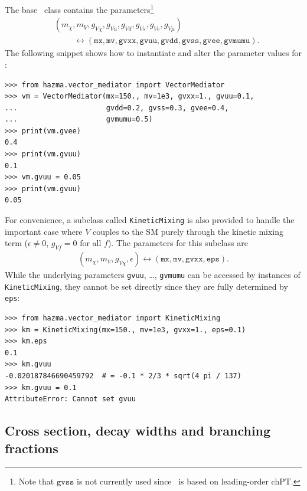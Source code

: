 The base \vm\ class contains the parameters\footnote{Note that $\texttt{gvss}$ is not currently used since \vm\ is based on leading-order chPT.}
\begin{align*}
    &(m_\chi, m_V, g_{V\chi}, g_{Vu}, g_{Vd}, g_{Vs}, g_{Ve}, g_{V\mu})\\
    &\hspace{1cm} \leftrightarrow (\texttt{mx}, \texttt{mv}, \texttt{gvxx}, \texttt{gvuu}, \texttt{gvdd}, \texttt{gvss}, \texttt{gvee}, \texttt{gvmumu}).
\end{align*}
The following snippet shows how to instantiate and alter the parameter values for \vm:
\begin{verbatim}
>>> from hazma.vector_mediator import VectorMediator
>>> vm = VectorMediator(mx=150., mv=1e3, gvxx=1., gvuu=0.1,
...                     gvdd=0.2, gvss=0.3, gvee=0.4,
...                     gvmumu=0.5)
>>> print(vm.gvee)
0.4
>>> print(vm.gvuu)
0.1
>>> vm.gvuu = 0.05
>>> print(vm.gvuu)
0.05
\end{verbatim}

For convenience, a subclass called \texttt{KineticMixing} is also provided to handle the important case where $V$ couples to the SM purely through the kinetic mixing term ($\epsilon \neq 0$, $g_{Vf} = 0$ for all $f$). The parameters for this subclass are
\begin{align*}
    (m_\chi, m_V, g_{V\chi}, \epsilon) \leftrightarrow (\texttt{mx}, \texttt{mv}, \texttt{gvxx}, \texttt{eps}).
\end{align*}
While the underlying parameters \texttt{gvuu}, \dots, \texttt{gvmumu} can be accessed by instances of \texttt{KineticMixing}, they cannot be set directly since they are fully determined by \texttt{eps}:
\begin{verbatim}
>>> from hazma.vector_mediator import KineticMixing
>>> km = KineticMixing(mx=150., mv=1e3, gvxx=1., eps=0.1)
>>> km.eps
0.1
>>> km.gvuu
-0.020187846690459792  # = -0.1 * 2/3 * sqrt(4 pi / 137)
>>> km.gvuu = 0.1
AttributeError: Cannot set gvuu
\end{verbatim}

\subsection{Cross section, decay widths and branching fractions}

